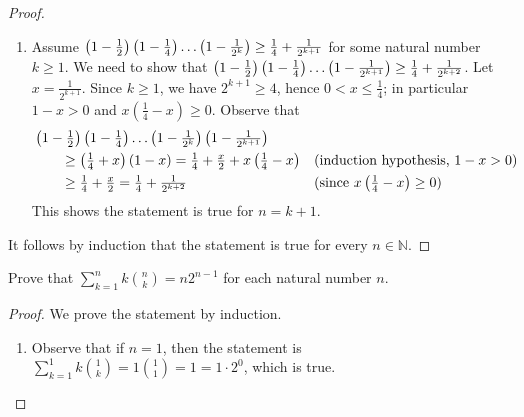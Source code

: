 \documentclass[DIN, pagenumber=false, fontsize=11pt, parskip=half]{scrartcl}
\begin{document}
\begin{problems}
\begin{proof}
\begin{enumerate}
            \item Assume $\left(1-\frac{1}{2}\right)\left(1-\frac{1}{4}\right)\mathellipsis\left(1-\frac{1}{2^k}\right) \geq \frac{1}{4}+\frac{1}{2^{k+1}}$ for some natural number $k \geq 1$.
                We need to show that $\left(1-\frac{1}{2}\right)\left(1-\frac{1}{4}\right)\mathellipsis\left(1-\frac{1}{2^{k+1}}\right) \geq \frac{1}{4}+\frac{1}{2^{k+2}}$.
                Let $x = \frac{1}{2^{k+1}}$.
                Since $k \geq 1$, we have $2^{k+1} \geq 4$, hence $0 < x \leq \frac{1}{4}$; in particular $1-x > 0$ and $x\left(\frac{1}{4}-x\right) \geq 0$.
                Observe that
                \begin{align*}
                    \MoveEqLeft \left(1-\tfrac{1}{2}\right)\left(1-\tfrac{1}{4}\right)\mathellipsis\left(1-\tfrac{1}{2^{k}}\right)\left(1-\tfrac{1}{2^{k+1}}\right)\\
                    & \geq \left(\tfrac{1}{4}+x\right)(1-x) = \tfrac{1}{4} + \tfrac{x}{2} + x\left(\tfrac{1}{4}-x\right) && \text{(induction hypothesis, $1-x > 0$)}\\
                    & \geq \tfrac{1}{4} + \tfrac{x}{2} = \tfrac{1}{4} + \tfrac{1}{2^{k+2}} && \text{(since $x\left(\tfrac{1}{4}-x\right) \geq 0$)}
                \end{align*}
                This shows the statement is true for $n = k+1$.
        \end{enumerate}
        It follows by induction that the statement is true for every $n \in \mathbb{N}$.
    \end{proof}


    \problem Prove that $\sum\limits_{k=1}^{n} k\binom{n}{k} = n2^{n-1}$ for each natural number $n$.
    \begin{proof}
        We prove the statement by induction.
        \begin{enumerate}
            \item Observe that if $n=1$, then the statement is $\sum\limits_{k=1}^{1} k\binom{1}{k} = 1\binom{1}{1} = 1 = 1 \cdot 2^0$, which is true.


\end{enumerate}
\end{proof}
\end{problems}
\end{document}
